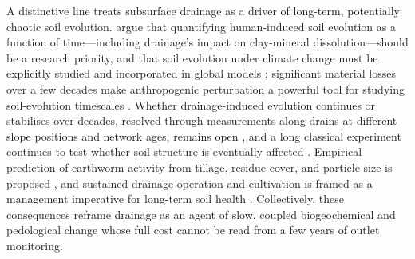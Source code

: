 \documentclass[11pt]{article}
\begin{document}
A distinctive line treats subsurface drainage as a driver of long-term,
potentially chaotic soil evolution. \textcite{Montagne2009} argue that
quantifying human-induced soil evolution as a function of time---including
drainage's impact on clay-mineral dissolution---should be a research priority,
and that soil evolution under climate change must be explicitly studied and
incorporated in global models \parencite{Montagne2010}; significant material
losses over a few decades make anthropogenic perturbation a powerful tool for
studying soil-evolution timescales \parencite{Montagne2013}. Whether
drainage-induced evolution continues or stabilises over decades, resolved through
measurements along drains at different slope positions and network ages, remains
open \parencite{Frison2009}, and a long classical experiment continues to test
whether soil structure is eventually affected \parencite{HOOGHOUDT1952}.
Empirical prediction of earthworm activity from tillage, residue cover, and
particle size is proposed \parencite{Ouellet2008}, and sustained drainage
operation and cultivation is framed as a management imperative for long-term soil
health \parencite{Singh2007}. Collectively, these consequences reframe drainage
as an agent of slow, coupled biogeochemical and pedological change whose full
cost cannot be read from a few years of outlet monitoring.

\printbibliography
\end{document}
